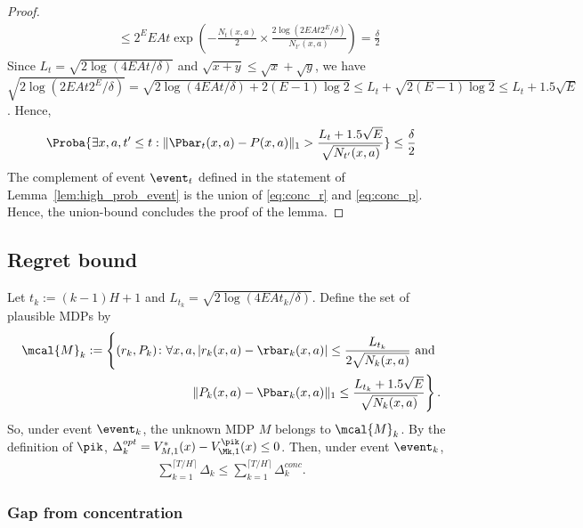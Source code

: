 \begin{proof}
\begin{align*}
            &\qquad \le 2^EEAt\exp\left(-\frac{N_t(x,a)}{2}\times\frac{2\log(2EAt2^E/\delta)}{N_{t'}(x,a)}\right) =\frac{\delta}2
            \end{align*}
            Since $L_t=\sqrt{2\log(4EAt/\delta)}$ and $\sqrt{x+y}\le\sqrt{x}+\sqrt{y}$, we have $\sqrt{2\log(2EAt2^E/\delta)}=\sqrt{2\log(4EAt/\delta) +2(E-1)\log2}\le L_t + \sqrt{2(E-1)\log2} \le L_t +1.5\sqrt{E}$.
            Hence,
            \begin{align}
            \label{eq:conc_p}
            \Proba{\exists x,a, t'\le t: \Vert\Pbar_t(x,a)-P(x,a)\Vert_1 >\frac{L_t+1.5\sqrt{E}}{\sqrt{N_{t'}(x,a)}}} \le \frac{\delta}2
            \end{align}
            The complement of event $\event_t$ defined in the statement of Lemma~\ref{lem:high_prob_event} is the union of \eqref{eq:conc_r} and \eqref{eq:conc_p}.
            Hence, the union-bound concludes the proof of the lemma.
        \end{proof}

\subsection{Regret bound}
\label{subsec:regret_ucrl2}

    Let $t_k:=(k-1)H+1$ and $L_{t_k}=\sqrt{2\log(4EAt_k/\delta)}$.
    Define the set of plausible MDPs by
    \begin{align*}
        \mcal{M}_k :=\left\{(r_k,P_k) \colon \forall x,a, \vert r_k(x,a)-\rbar_k(x,a)\vert \le \frac{L_{t_k}}{2\sqrt{N_k(x,a)}} \text{ and }\right. \\
        \left. \Vert P_k(x,a)-\Pbar_k(x,a)\Vert_1\le \frac{L_{t_k}+1.5\sqrt{E}}{\sqrt{N_k(x,a)}}\right\}.
    \end{align*}
    So, under event $\event_k$, the unknown MDP $M$ belongs to $\mcal{M}_k$.
    By the definition of $\pik$, $\Delta_k^{opt}=V^*_{M,1}(x) -V^{\pik}_{\Mk,1}(x)\le0$.
    Then, under event $\event_k$,
    \begin{align*}
        \sum_{k=1}^{\lceil T/H\rceil}\Delta_k \le \sum_{k=1}^{\lceil T/H\rceil}\Delta_k^{conc}.
    \end{align*}
    
    \subsubsection{Gap from concentration}
    \label{subsubsec:sec_gap_conc}
    

